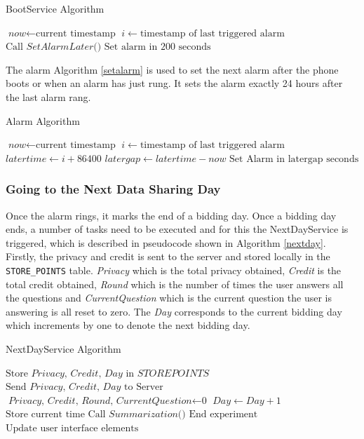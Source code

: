 \begin{algorithm}
\caption{BootService Algorithm}\label{boot}
\begin{algorithmic}[1]
\State $\textit{now} \gets \text{current timestamp}$
\State $i \gets \text{timestamp of last triggered alarm}$
  \State $\text{Call }\textit{SetAlarmLater()}$
\Else
  \State $\text{Set alarm in 200 seconds}$
\EndIf
\EndProcedure
\end{algorithmic}
\end{algorithm}

The alarm Algorithm \ref{setalarm} is used to set the next alarm after the phone boots or when an alarm has just rung. It sets the alarm exactly 24 hours after the last alarm rang.

\begin{algorithm}
\caption{Alarm Algorithm}\label{setalarm}
\begin{algorithmic}[1]
\State $\textit{now} \gets \text{current timestamp}$
\State $i \gets \text{timestamp of last triggered alarm}$
\State $\textit{latertime} \gets \textit{i}+\text{86400}$
\State $\textit{latergap} \gets \textit{latertime}-\textit{now}$
\State $\text{Set Alarm in latergap seconds}$
\EndProcedure
\end{algorithmic}
\end{algorithm}

\subsubsection{Going to the Next Data Sharing Day} \label{next}
Once the alarm rings, it marks the end of a bidding day. Once a bidding day ends, a number of tasks need to be executed
and for this the NextDayService is triggered, which is described in pseudocode shown in Algorithm \ref{nextday}. Firstly, the privacy and credit is sent to the server and stored locally in the \texttt{STORE\_POINTS} table. \textit{Privacy} which is the total privacy obtained, \textit{Credit} is the total credit obtained, \textit{Round} which is the number of times the user answers all the questions and \textit{CurrentQuestion} which is the current question the user is answering is all reset to zero. The \textit{Day} corresponds to the current bidding day which increments by one to denote the next bidding day.

\begin{algorithm}
\caption{NextDayService Algorithm}\label{nextday}
\begin{algorithmic}[1]
\State $\text{Store }\textit{Privacy, Credit, Day } \text{in } \textit{STOREPOINTS}$
\State $\text{Send }\textit{Privacy, Credit, Day } \text{to Server}$
\State $\textit{Privacy, Credit, Round, CurrentQuestion} \gets \text{0}$
\State $\textit{Day} \gets \textit{Day}+1$
\State $\text{Store current time}$
\State $\text{Call }\textit{Summarization()}$
  \State $\text{End experiment}$
\Else
  \State $\text{Update user interface elements}$ 
\EndIf
\EndProcedure
\end{algorithmic}
\end{algorithm}


